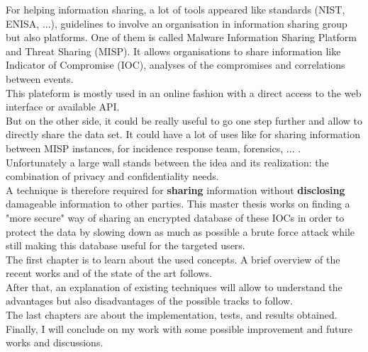 \documentclass{eplmastersthesis}
\begin{document}
For helping information sharing, a lot of tools appeared like standards (NIST, ENISA, ...), guidelines to involve an organisation in information sharing group but also platforms. One of them is called Malware Information Sharing Platform and Threat Sharing (MISP). It allows organisations to share information like Indicator of Compromise (IOC), analyses of the compromises and correlations between events.\\
This plateform is mostly used in an online fashion with a direct access to the web interface or available API.\\
But on the other side, it could be really useful to go one step further and allow to directly share the data set. It could have a lot of uses like for sharing information between MISP instances, for incidence response team, forensics, ... .\\
Unfortunately a large wall stands between the idea and its realization: the combination of privacy and confidentiality needs.\\ 
A technique is therefore required for \textbf{sharing} information without \textbf{disclosing} damageable information to other parties. This master thesis works on finding a "more secure" way of sharing an encrypted database of these IOCs in order to protect the data by slowing down as much as possible a brute force attack while still making this database useful for the targeted users.\\

The first chapter is to learn about the used concepts. A brief overview of the recent works and of the state of the art follows.\\
After that, an explanation of existing techniques will allow to understand the advantages but also disadvantages of the possible tracks to follow.\\

The last chapters are about the implementation, tests, and results obtained.\\
Finally, I will conclude on my work with some possible improvement and future works and discussions.
\end{document}
